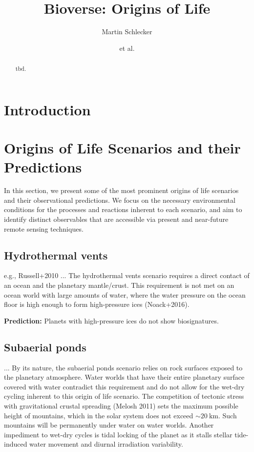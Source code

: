\documentclass[modern,linenumbers]{aastex631}
\begin{document}
\title{Bioverse: Origins of Life}

\author{Martin Schlecker}
\author{et al.}

\begin{abstract}
    tbd.
\end{abstract}

\section{Introduction}
\label{sec:intro}

\section{Origins of Life Scenarios and their Predictions}
\label{sec:ool_scenarios}
In this section, we present some of the most prominent origins of life scenarios and their observational predictions.
We focus on the necessary environmental conditions for the processes and reactions inherent to each scenario, and aim to identify distinct observables that are accessible via present and near-future remote sensing techniques.

\subsection{Hydrothermal vents}
e.g., Russell+2010
...
The hydrothermal vents scenario requires a direct contact of an ocean and the planetary mantle/crust.
This requirement is not met on an ocean world with large amounts of water, where the water pressure on the ocean floor is high enough to form high-pressure ices (Noack+2016). %

\textbf{Prediction:} Planets with high-pressure ices do not show biosignatures.


\subsection{Subaerial ponds}
...
By its nature, the subaerial ponds scenario relies on rock surfaces exposed to the planetary atmosphere.
Water worlds that have their entire planetary surface covered with water contradict this requirement and do not allow for the wet-dry cycling inherent to this origin of life scenario.
The competition of tectonic stress with gravitational crustal spreading (Melosh 2011) sets the maximum possible height of mountains, which in the solar system does not exceed $\sim \SI{20}{\kilo\meter}$.
Such mountains will be permanently under water on water worlds.
Another impediment to wet-dry cycles is tidal locking of the planet as it stalls stellar tide-induced water movement and diurnal irradiation variability.
\end{document}
